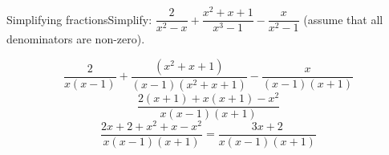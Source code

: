 \begin{wex}{Simplifying fractions}{Simplify: $\dfrac{2}{{x}^{2}-x}+\dfrac{x^{2}+x+1}{x^{3}-1}-\dfrac{x}{{x}^{2}-1}$ 
(assume that all denominators are non-zero).}
{
\begin{equation*}
\dfrac{2}{x(x-1)}+ \dfrac{({x}^{2} + x + 1)}{(x-1)(x^{2}+x+1)}-\dfrac{x}{(x-1)(x+1)}
\end{equation*}
\begin{equation*}
\dfrac{2(x+1)+x(x+1)-x^{2}}{x(x-1)(x+1)}
\end{equation*}
\begin{equation*}
\dfrac{2x+2 + x^{2} + x - x^{2}}{x(x-1)(x+1)} = \dfrac{3x+2}{x(x-1)(x+1)}
\end{equation*}

}
\end{wex}


